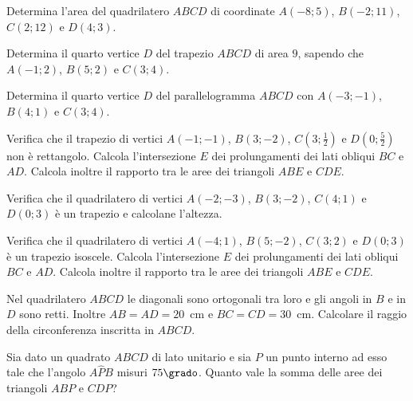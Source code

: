 \begin{multicols}{2}
\begin{esercizio}
\label{ese:7.93}
Determina l'area del quadrilatero $ABCD$ di coordinate $A(-8;5)$, 
$B(-2;11)$, $C(2;12)$ e $D(4;3)$.
\end{esercizio}

\begin{esercizio}
\label{ese:7.94}
Determina il quarto vertice $D$ del trapezio $ABCD$ di area $9$, 
sapendo che $A(-1;2)$, $B(5;2)$ e $C(3;4)$.
\end{esercizio}

\begin{esercizio}
\label{ese:7.95}
Determina il quarto vertice $D$ del parallelogramma $ABCD$ con 
$A(-3;-1)$, $B(4;1)$ e $C(3;4)$.
\end{esercizio}

\begin{esercizio}
\label{ese:7.96}
Verifica che il trapezio di vertici $A(-1;-1)$, $B(3;-2)$, 
$C\left(3;\frac{1}{2}\right)$ e $D\left(0;\frac{5}{2}\right)$ non è 
rettangolo. Calcola l'intersezione $E$ dei prolungamenti dei lati 
obliqui $BC$ e $AD$. Calcola inoltre il rapporto tra le aree dei 
triangoli $ABE$ e $CDE$.
\end{esercizio}

\begin{esercizio}
\label{ese:7.97}
Verifica che il quadrilatero di vertici $A(-2;-3)$, $B(3;-2)$, 
$C(4;1)$ e $D(0;3)$ è un trapezio e calcolane l'altezza.
\end{esercizio}

\begin{esercizio}
\label{ese:7.98}
Verifica che il quadrilatero di vertici $A(-4;1)$, $B(5;-2)$, 
$C(3;2)$ e $D(0;3)$ è un trapezio isoscele. Calcola l'intersezione $E$ 
dei prolungamenti dei lati obliqui $BC$ e $AD$. Calcola inoltre il 
rapporto tra le aree dei triangoli $ABE$ e $CDE$.
\end{esercizio}

\begin{esercizio}
\label{ese:7.99}
Nel quadrilatero $ABCD$ le diagonali sono ortogonali tra loro e gli 
angoli in $B$ e in $D$ sono retti. Inoltre $AB=AD=20$~cm e 
$BC=CD=30$~cm. Calcolare il raggio della circonferenza inscritta in 
$ABCD$.
\end{esercizio}

\begin{esercizio}
\label{ese:7.100}
Sia dato un quadrato $ABCD$ di lato unitario e sia $P$ un punto 
interno ad esso tale che l'angolo $A\widehat{P}B$ misuri $75\grado$. 
Quanto vale la somma delle aree dei triangoli $ABP$ e $CDP$? 
\end{esercizio}


\end{multicols}
